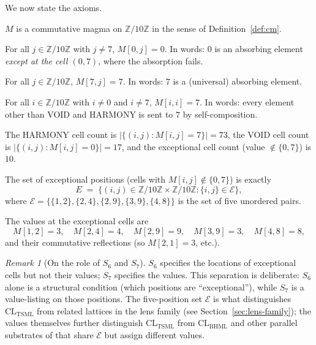 \documentclass[11pt,reqno]{amsart}
\theoremstyle{plain}
\theoremstyle{definition}
\theoremstyle{remark}
\newtheorem*{remark}{Remark}
\newcommand{\Z}{\mathbb{Z}}
\newcommand{\TSML}{\mathrm{TSML}}
\newcommand{\BHML}{\mathrm{BHML}}
\newcommand{\CL}{\mathrm{CL}}
\begin{document}
We now state the axioms.

\begin{description}
\setlength\itemsep{4pt}

\item[$S_{1}$ (Substrate type).] $M$ is a commutative magma on
$\Z/10\Z$ in the sense of Definition~\ref{def:cm}.

\item[$S_{2}$ (Near-absorption with puncture at $V = 0$).]
For all $j \in \Z/10\Z$ with $j \neq 7$, $M[0, j] = 0$. In words:
$0$ is an absorbing element \emph{except at the cell $(0, 7)$}, where
the absorption fails.

\item[$S_{3}$ (Absorption at $H = 7$).] For all $j \in \Z/10\Z$,
$M[7, j] = 7$. In words: $7$ is a (universal) absorbing element.

\item[$S_{4}$ (Idempotence outside $\{V, H\}$).] For all
$i \in \Z/10\Z$ with $i \neq 0$ and $i \neq 7$, $M[i, i] = 7$. In
words: every element other than VOID and HARMONY is sent to $7$ by
self-composition.

\item[$S_{5}$ (Cell-count constraint).] The HARMONY cell count is
$|\{(i, j) : M[i, j] = 7\}| = 73$, the VOID cell count is
$|\{(i, j) : M[i, j] = 0\}| = 17$, and the exceptional cell count
(value $\notin \{0, 7\}$) is $10$.

\item[$S_{6}$ (Exceptional positions).] The set of exceptional
positions (cells with $M[i, j] \notin \{0, 7\}$) is exactly
\[
E \;=\; \{(i, j) \in \Z/10\Z \times \Z/10\Z : \{i, j\} \in
\mathcal{E}\},
\]
where $\mathcal{E} = \{\{1, 2\}, \{2, 4\}, \{2, 9\}, \{3, 9\},
\{4, 8\}\}$ is the set of five unordered pairs.

\item[$S_{7}$ (Exceptional values).] The values at the exceptional
cells are
\[
M[1, 2] = 3, \quad M[2, 4] = 4, \quad M[2, 9] = 9,
\quad M[3, 9] = 3, \quad M[4, 8] = 8,
\]
and their commutative reflections (so $M[2, 1] = 3$, etc.).

\end{description}

\begin{remark}[On the role of $S_{6}$ and $S_{7}$]
$S_{6}$ specifies the locations of exceptional cells but not their
values; $S_{7}$ specifies the values. This separation is deliberate:
$S_{6}$ alone is a structural condition (which positions are
``exceptional''), while $S_{7}$ is a value-listing on those positions.
The five-position set $\mathcal{E}$ is what distinguishes
$\CL_{\TSML}$ from related lattices in the lens family (see
Section~\ref{sec:lens-family}); the values themselves further
distinguish $\CL_{\TSML}$ from $\CL_{\BHML}$ and other parallel
substrates of \cite{SandersGishFourCore} that share $\mathcal{E}$ but
assign different values.
\end{remark}
\end{document}
